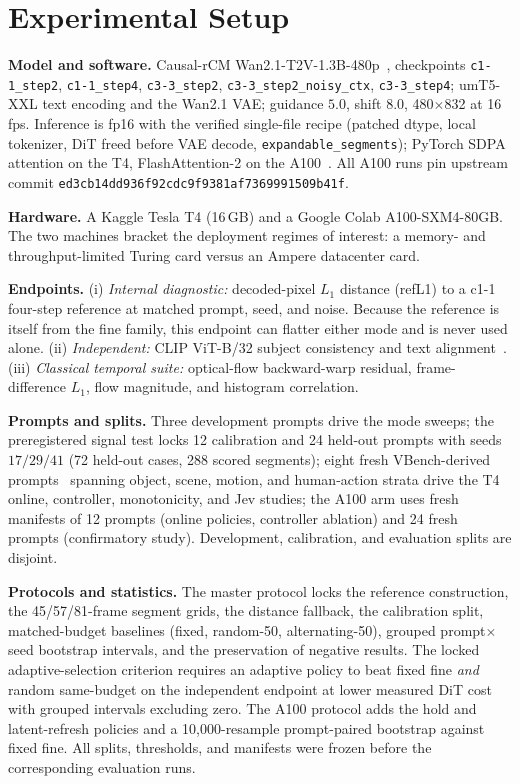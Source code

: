 \documentclass[journal]{IEEEtran}
\newcommand{\cfine}{\textup{c1-1}}
\begin{document}
\section{Experimental Setup}
\label{sec:setup}

\textbf{Model and software.} Causal-rCM Wan2.1-T2V-1.3B-480p~\cite{zhengCausalrCMUnifiedTeacherForcing2026,wan2025wan}, checkpoints \texttt{c1-1\_step2}, \texttt{c1-1\_step4}, \texttt{c3-3\_step2}, \texttt{c3-3\_step2\_noisy\_ctx}, \texttt{c3-3\_step4}; umT5-XXL text encoding and the Wan2.1 VAE; guidance $5.0$, shift $8.0$, 480$\times$832 at 16\,fps. Inference is fp16 with the verified single-file recipe (patched dtype, local tokenizer, DiT freed before VAE decode, \texttt{expandable\_segments}); PyTorch SDPA attention on the T4, FlashAttention-2 on the A100~\cite{dao2022flashattention}. All A100 runs pin upstream commit \texttt{ed3cb14dd936f92cdc9f9381af7369991509b41f}.

\textbf{Hardware.} A Kaggle Tesla T4 (16\,GB) and a Google Colab A100-SXM4-80GB. The two machines bracket the deployment regimes of interest: a memory- and throughput-limited Turing card versus an Ampere datacenter card.

\textbf{Endpoints.} (i) \emph{Internal diagnostic:} decoded-pixel $L_1$ distance (refL1) to a \cfine{} four-step reference at matched prompt, seed, and noise. Because the reference is itself from the fine family, this endpoint can flatter either mode and is never used alone. (ii) \emph{Independent:} CLIP ViT-B/32 subject consistency and text alignment~\cite{radford2021clip,huang2024vbench}. (iii) \emph{Classical temporal suite:} optical-flow backward-warp residual, frame-difference $L_1$, flow magnitude, and histogram correlation.

\textbf{Prompts and splits.} Three development prompts drive the mode sweeps; the preregistered signal test locks 12 calibration and 24 held-out prompts with seeds $17/29/41$ (72 held-out cases, 288 scored segments); eight fresh VBench-derived prompts~\cite{huang2024vbench} spanning object, scene, motion, and human-action strata drive the T4 online, controller, monotonicity, and Jev studies; the A100 arm uses fresh manifests of 12 prompts (online policies, controller ablation) and 24 fresh prompts (confirmatory study). Development, calibration, and evaluation splits are disjoint.

\textbf{Protocols and statistics.} The master protocol locks the reference construction, the 45/57/81-frame segment grids, the distance fallback, the calibration split, matched-budget baselines (fixed, random-50, alternating-50), grouped prompt$\times$seed bootstrap intervals, and the preservation of negative results. The locked adaptive-selection criterion requires an adaptive policy to beat fixed fine \emph{and} random same-budget on the independent endpoint at lower measured DiT cost with grouped intervals excluding zero. The A100 protocol adds the hold and latent-refresh policies and a 10{,}000-resample prompt-paired bootstrap against fixed fine. All splits, thresholds, and manifests were frozen before the corresponding evaluation runs.
\end{document}

